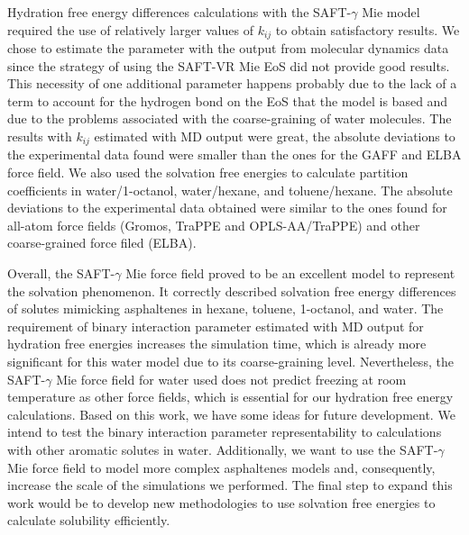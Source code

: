 Hydration free energy differences calculations with the SAFT-$\gamma$ Mie model required the use of relatively larger values of $k_{ij}$ to obtain satisfactory results. We chose to estimate the parameter with the output from molecular dynamics data since the strategy of using the SAFT-VR Mie EoS did not provide good results. This necessity of one additional parameter happens probably due to the lack of a term to account for the hydrogen bond on the EoS that the model is based and due to the problems associated with the coarse-graining of water molecules. The results with $k_{ij}$ estimated with MD output were great, the absolute deviations to the experimental data found were smaller than the ones for the GAFF and ELBA force field. We also used the solvation free energies to calculate partition coefficients in water/1-octanol, water/hexane, and toluene/hexane. The absolute deviations to the experimental data obtained were similar to the ones found for all-atom force fields (Gromos, TraPPE and OPLS-AA/TraPPE) and other coarse-grained force filed (ELBA).

Overall, the SAFT-$\gamma$ Mie force field proved to be an excellent model to represent the solvation phenomenon. It correctly described solvation free energy differences of solutes mimicking asphaltenes in hexane, toluene, 1-octanol, and water. The requirement of binary interaction parameter estimated with MD output for hydration free energies increases the simulation time, which is already more significant for this water model due to its coarse-graining level. Nevertheless, the SAFT-$\gamma$ Mie force field for water used does not predict freezing at room temperature as other force fields, which is essential for our hydration free energy calculations. Based on this work, we have some ideas for future development. We intend to test the binary interaction parameter representability to calculations with other aromatic solutes in water. Additionally, we want to use the SAFT-$\gamma$ Mie force field to model more complex asphaltenes models and, consequently, increase the scale of the simulations we performed. The final step to expand this work would be to develop new methodologies to use solvation free energies to calculate solubility efficiently.


